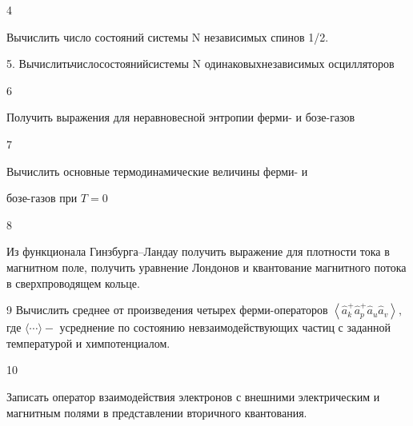 \documentclass[a4paper,12pt]{article} %
\begin{document}
\begin{task}

4

Вычислить число состояний системы N независимых спинов 1/2.


\end{task}


\begin{task}

5. Вычислитьчислосостоянийсистемы N одинаковыхнезависимых осцилляторов



\end{task}


\begin{task}

6

Получить выражения для неравновесной энтропии ферми- и бозе-газов


\end{task}


\begin{task}
7

Вычислить основные термодинамические величины ферми- и

бозе-газов при $T=0$


\end{task}


\begin{task}

8

Из функционала Гинзбурга–Ландау получить выражение для плотности тока в магнитном поле, получить уравнение Лондонов и квантование магнитного потока в сверхпроводящем кольце.


\end{task}


\begin{task}

9
Вычислить среднее от произведения четырех ферми-операторов  $\left\langle\hat{a}_{k}^{+} \hat{a}_{p}^{+} \hat{a}_{u} \hat{a}_{v}\right\rangle,$ где $\langle\cdots\rangle-$ усреднение по состоянию невзаимодействующих частиц с заданной температурой и химпотенциалом.

\end{task}


\begin{task}

10

Записать оператор взаимодействия электронов с внешними электрическим и магнитным полями в представлении вторичного квантования.


\end{task}
\end{document}
